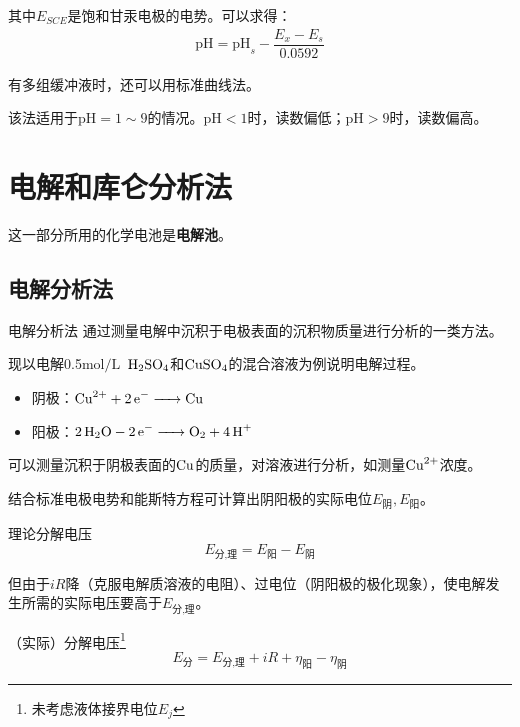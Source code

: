 其中$E_{SCE}$是饱和甘汞电极的电势。可以求得：
\begin{gather*}
	\mathrm{pH}=\mathrm{pH}_s-\dfrac{E_x-E_s}{0.0592}
\end{gather*}

有多组缓冲液时，还可以用标准曲线法。

该法适用于$\mathrm{pH}=1\sim 9$的情况。$\mathrm{pH}<1$时，读数偏低；$\mathrm{pH}>9$时，读数偏高。

\section{电解和库仑分析法}

这一部分所用的化学电池是\textbf{电解池}。

\subsection{电解分析法}
\begin{definition*}{电解分析法}{}
	通过测量电解中沉积于电极表面的沉积物质量进行分析的一类方法。
\end{definition*}

\begin{example}
	现以电解0.5$\mathrm{mol/L}$\ $\ce{H2SO4}$和$\ce{CuSO4}$的混合溶液为例说明电解过程。
	
	\begin{itemize}
		\item 阴极：$\ce{Cu^2+ + 2e- -> Cu}$
		\item 阳极：$\ce{2H2O - 2e- -> O2 + 4H+}$
	\end{itemize}

	可以测量沉积于阴极表面的$\ce{Cu}$的质量，对溶液进行分析，如测量$\ce{Cu^2+}$浓度。
\end{example}

结合标准电极电势和能斯特方程可计算出阴阳极的实际电位$E_{\text{阴}},E_{\text{阳}}$。

\begin{definition*}{理论分解电压}{}
	\begin{equation*}
	E_{\text{分,理}}=E_{\text{阳}}-E_{\text{阴}}
	\end{equation*}
\end{definition*}

但由于$iR$降（克服电解质溶液的电阻）、过电位（阴阳极的极化现象），使电解发生所需的实际电压要高于$E_{\text{分,理}}$。

\begin{definition*}{（实际）分解电压\footnote{未考虑液体接界电位$E_j$}}{}
	\begin{equation*}
	E_{\text{分}}=E_{\text{分,理}}+iR+\eta_{\text{阳}}-\eta_{\text{阴}}
	\end{equation*}
\end{definition*}

